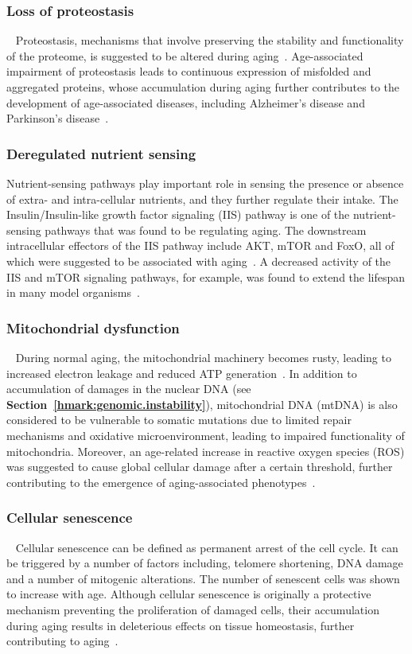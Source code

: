 \subsubsection{Loss of proteostasis}~\label{hmark:proteosis}
Proteostasis, mechanisms that involve preserving the stability and functionality of the proteome, is suggested to be altered during aging~\cite{Koga2011}. 
Age-associated impairment of proteostasis leads to continuous expression of misfolded and aggregated proteins, 
whose accumulation during aging further contributes to the development of age-associated diseases, including Alzheimer's disease and Parkinson's disease~\cite{Powers2009}.

\subsubsection{Deregulated nutrient sensing}
Nutrient-sensing pathways play important role in sensing the presence or absence of extra- and intra-cellular nutrients, and they further regulate their intake.
The Insulin/Insulin-like growth factor signaling (IIS) pathway is one of the nutrient-sensing pathways that was found to be regulating aging.
The downstream intracellular effectors of the IIS pathway include AKT, mTOR and FoxO, all of which were suggested to be associated with aging~\cite{Fontana2010, Barzilai2012, Kenyon2010}.
A decreased activity of the IIS and mTOR signaling pathways, for example, was found to extend the lifespan in many model organisms~\cite{Fontana2010}. 

\subsubsection{Mitochondrial dysfunction}~\label{hmark:mt.dysfunction}
During normal aging, the mitochondrial machinery becomes rusty, leading to increased electron leakage and reduced ATP generation~\cite{Green2011}.
In addition to accumulation of damages in the nuclear DNA (see \textbf{Section~\ref{hmark:genomic.instability}}), 
mitochondrial DNA (mtDNA) is also considered to be vulnerable to somatic mutations due to limited repair mechanisms and oxidative microenvironment,
leading to impaired functionality of mitochondria.
Moreover, an age-related increase in reactive oxygen species (ROS) was suggested to cause global cellular damage after a certain threshold, 
further contributing to the emergence of aging-associated phenotypes~\cite{Hekimi2011}.

\subsubsection{Cellular senescence}~\label{hmark:cell.senes}
Cellular senescence can be defined as permanent arrest of the cell cycle.
It can be triggered by a number of factors including, telomere shortening, DNA damage and a number of mitogenic alterations.
The number of senescent cells was shown to increase with age.
Although cellular senescence is originally a protective mechanism preventing the proliferation of damaged cells,
their accumulation during aging results in deleterious effects on tissue homeostasis, further contributing to aging~\cite{Lopez2013}.

